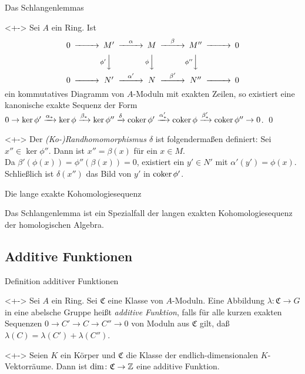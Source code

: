 \begin{frame}{Das Schlangenlemmas}
	\begin{proposition}[Schlangenlemma]<+->
		Sei \(A\) ein Ring. Ist
		\[
			\begin{CD}
				0 @>>> M' @>{\alpha}>> M @>{\beta}>> M'' @>>> 0 \\
				& & @V{\phi'}VV @V{\phi}VV @V{\phi''}VV \\
				0 @>>> N' @>{\alpha'}>> N @>{\beta'}>> N'' @>>> 0
			\end{CD}
		\]
		ein kommutatives Diagramm von \(A\)-Moduln mit exakten Zeilen, so
		existiert eine kanonische exakte Sequenz der Form
		\(0 \to \ker \phi' \xrightarrow{\alpha_*} \ker \phi \xrightarrow{\beta_*} \ker \phi''
			\xrightarrow{\delta}
			\operatorname{coker} \phi' \xrightarrow{\alpha'_*} \operatorname{coker} \phi \xrightarrow{\beta'_*}
			\operatorname{coker} \phi'' \to 0\).
		\qed
	\end{proposition}
	\begin{visibleenv}<+->
		Der \emph{(Ko-)Randhomomorphismus \(\delta\)} ist folgendermaßen definiert: Sei \(x'' \in \ker 
		\phi''\). Dann ist \(x'' = \beta(x)\) für ein \(x \in M\).
		\\
		Da \(\beta'(\phi(x)) = \phi''(\beta(x)) = 0\), existiert ein \(y' \in N'\) mit \(\alpha'(y') =
		\phi(x)\).
		\\
		Schließlich ist \(\delta(x'')\) das Bild von \(y'\) in \(\operatorname{coker} \phi'\).
	\end{visibleenv}
\end{frame}

\begin{frame}{Die lange exakte Kohomologiesequenz}
	\begin{remark}
		Das Schlangenlemma ist ein Spezialfall der langen exakten Kohomologiesequenz der
		homologischen Algebra.
	\end{remark}
\end{frame}

\subsection{Additive Funktionen}

\begin{frame}{Definition additiver Funktionen}
	\begin{definition}<+->
		Sei \(A\) ein Ring. Sei \(\mathfrak C\) eine Klasse von \(A\)-Moduln. Eine Abbildung
		\(\lambda\colon \mathfrak C \to G\) in eine abelsche Gruppe heißt \emph{additive Funktion},
		falls für alle kurzen exakten Sequenzen
		\(0 \to C' \to C \to C'' \to 0\) von Moduln aus \(\mathfrak C\) gilt, daß \(\lambda(C) =
		\lambda(C') + \lambda(C'')\).
	\end{definition}
	\begin{example}<+->
		Seien \(K\) ein Körper und \(\mathfrak C\) die Klasse der endlich-dimensionalen \(K\)-Vektorräume.
		Dann ist \(\dim\colon \mathfrak C \to \mathbb Z\) eine additive Funktion.
	\end{example}
\end{frame}

